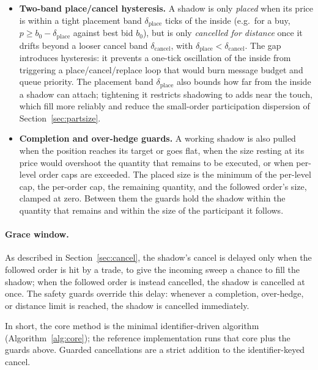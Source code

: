 \documentclass[11pt]{article}
\begin{document}
\begin{itemize}[leftmargin=1.4em]
  \item \textbf{Two-band place/cancel hysteresis.} A shadow is only
  \emph{placed} when its price is within a tight placement band
  $\delta_{\text{place}}$ ticks of the inside (e.g.\ for a buy,
  $p \ge b_0-\delta_{\text{place}}$ against best bid $b_0$), but is only
  \emph{cancelled for distance} once it drifts beyond a looser cancel band
  $\delta_{\text{cancel}}$, with $\delta_{\text{place}}<\delta_{\text{cancel}}$.
  The gap introduces hysteresis: it
  prevents a one-tick oscillation of the inside from triggering a
  place/cancel/replace loop that would burn message budget and queue priority.
  The placement band $\delta_{\text{place}}$ also bounds how far from the inside a
  shadow can attach; tightening it restricts shadowing to adds near the touch,
  which fill more reliably and reduce the small-order participation dispersion of
  Section~\ref{sec:partsize}.
  \item \textbf{Completion and over-hedge guards.} A working shadow is also
  pulled when the position reaches its target or goes flat, when the size
  resting at its price would overshoot the quantity that remains to be executed,
  or when per-level order caps are exceeded. The placed size is the minimum of
  the per-level cap, the per-order cap, the remaining quantity, and the followed
  order's size, clamped at zero. Between them the guards hold the shadow within
  the quantity that remains and within the size of the participant it follows.
\end{itemize}

\paragraph{Grace window.} As described in Section~\ref{sec:cancel}, the shadow's
cancel is delayed only when the followed order is hit by a trade, to give the
incoming sweep a chance to fill the shadow; when the followed order is instead
cancelled, the shadow is cancelled at once. The safety guards override this
delay: whenever a completion, over-hedge, or distance limit is reached, the
shadow is cancelled immediately.

In short, the core method is the minimal identifier-driven algorithm
(Algorithm~\ref{alg:core}); the reference implementation runs that core plus the
guards above. Guarded cancellations are a strict addition to the
identifier-keyed cancel.
\end{document}
